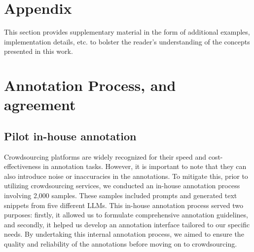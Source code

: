 \newpage
\appendix

\section{Appendix}
\label{sec:appendix}

%

This section provides supplementary material in the form of additional examples, implementation details, etc. to bolster the reader's understanding of the concepts presented in this work.

\section{Annotation Process, and agreement}
\label{subsec:annotation}

\subsection{Pilot in-house annotation}
\label{subsec:pilot_annotation}
Crowdsourcing platforms are widely recognized for their speed and cost-effectiveness in annotation tasks. However, it is important to note that they can also introduce noise or inaccuracies in the annotations. To mitigate this, prior to utilizing crowdsourcing services, we conducted an in-house annotation process involving 2,000 samples. These samples included prompts and generated text snippets from five different LLMs. This in-house annotation process served two purposes: firstly, it allowed us to formulate comprehensive annotation guidelines, and secondly, it helped us develop an annotation interface tailored to our specific needs. By undertaking this internal annotation process, we aimed to ensure the quality and reliability of the annotations before moving on to crowdsourcing.


